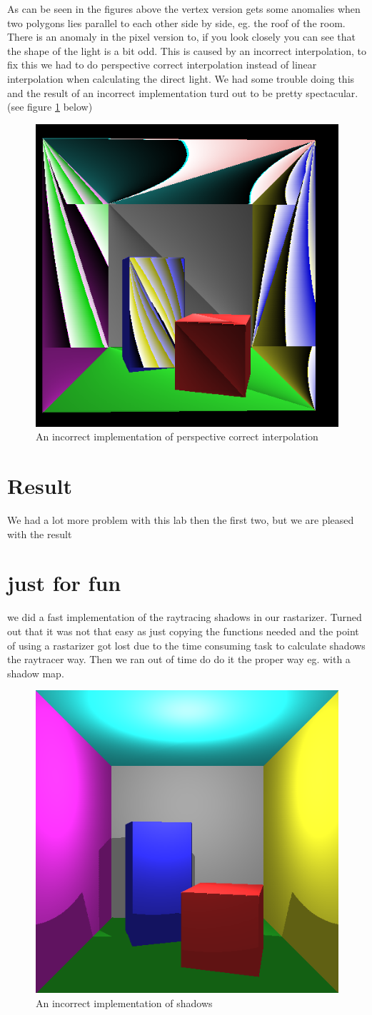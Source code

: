 \documentclass[a4paper,11pt]{article}
\begin{document}
As can be seen in the figures above the vertex version gets some anomalies when two polygons lies parallel to each other side by side, eg. the roof of the room. There is an anomaly in the pixel version to, if you look closely you can see that the shape of the light is a bit odd. This is caused by an incorrect interpolation, to fix this we had to do perspective correct interpolation instead of linear interpolation when calculating the direct light. We had some trouble doing this and the result of an incorrect implementation turd out to be pretty spectacular. (see figure \ref{fun} below)
\begin{figure}[h!]
	\centering
	\includegraphics[width=0.45\linewidth]{fun.png}
	\caption{An incorrect implementation of perspective correct interpolation}
	\label{fun}
\end{figure}

\section{Result}
We had a lot more problem with this lab then the first two, but we are pleased with the result 


\section{just for fun}
 we did a fast implementation of the raytracing shadows in our rastarizer. Turned out that it was not that easy as just copying the functions needed and the point of using a rastarizer got lost due to the time consuming task to calculate shadows the raytracer way. Then we ran out of time do do it the proper way eg. with a shadow map.
\begin{figure}[h!]
	\centering
	\includegraphics[width=0.45\linewidth]{shadows.png}
	\caption{An incorrect implementation of shadows}
	\label{shadows}
\end{figure}
\end{document}
